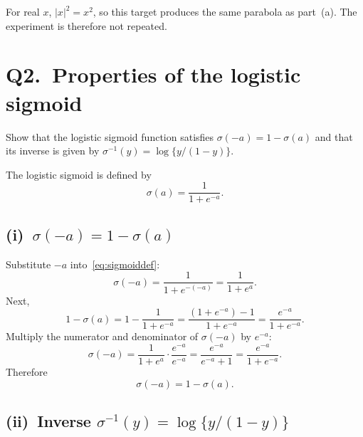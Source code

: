 \documentclass[12pt,a4paper]{article}
\begin{document}
For real $x$, $|x|^{2}=x^{2}$, so this target produces the same parabola as
part~(a). The experiment is therefore not repeated.

\clearpage
\section*{Q2.\ Properties of the logistic sigmoid}

Show that the logistic sigmoid function satisfies
\(\sigma(-a)=1-\sigma(a)\) and that its inverse is given by
\(\sigma^{-1}(y)=\log\{y/(1-y)\}\).

The logistic sigmoid is defined by
\begin{equation}
  \sigma(a)=\frac{1}{1+e^{-a}}.
  \label{eq:sigmoiddef}
\end{equation}

\subsection*{(i)\ \(\sigma(-a)=1-\sigma(a)\)}

Substitute \(-a\) into~\eqref{eq:sigmoiddef}:
\begin{equation}
  \sigma(-a)=\frac{1}{1+e^{-(-a)}}=\frac{1}{1+e^{a}}.
\end{equation}
Next,
\begin{equation}
  1-\sigma(a)
    =1-\frac{1}{1+e^{-a}}
    =\frac{(1+e^{-a})-1}{1+e^{-a}}
    =\frac{e^{-a}}{1+e^{-a}}.
\end{equation}
Multiply the numerator and denominator of \(\sigma(-a)\) by \(e^{-a}\):
\begin{equation}
  \sigma(-a)
    =\frac{1}{1+e^{a}}\cdot\frac{e^{-a}}{e^{-a}}
    =\frac{e^{-a}}{e^{-a}+1}
    =\frac{e^{-a}}{1+e^{-a}}.
\end{equation}
Therefore
\begin{equation}
  \sigma(-a)=1-\sigma(a).
\end{equation}

\subsection*{(ii)\ Inverse \(\sigma^{-1}(y)=\log\{y/(1-y)\}\)}
\end{document}
